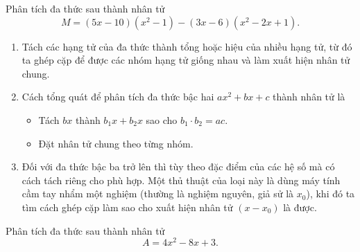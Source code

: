 \begin{vd}
Phân tích đa thức sau thành nhân tử
\[M=(5x-10)\left( x^2-1\right) - (3x-6) \left( x^2-2x+1\right) .\]
\end{vd}

\begin{dang}
\begin{enumerate}[\tickEX]
\item Tách các hạng tử của đa thức thành tổng hoặc hiệu của nhiều hạng tử, từ đó ta ghép cặp để được các nhóm hạng tử giống nhau và làm xuất hiện nhân tử chung.
\item Cách tổng quát để phân tích đa thức bậc hai $ax^2+bx+c$ thành nhân tử là 
\begin{itemize}
\item Tách $bx$ thành $b_1x+b_2x$ sao cho $b_1\cdot b_2=ac$.
\item Đặt nhân tử chung theo từng nhóm.
\end{itemize}
\item Đối với đa thức bậc ba trở lên thì tùy theo đặc điểm của các hệ số mà có cách tách riêng cho phù hợp. Một thủ thuật của loại này là dùng máy tính cầm tay nhẩm một nghiệm (thường là nghiệm nguyên, giả sử là $x_0$), khi đó ta tìm cách ghép cặp làm sao cho xuất hiện nhân tử $(x-x_0)$ là được.
\end{enumerate}
\end{dang}

\begin{vd}
Phân tích đa thức sau thành nhân tử
\[A=4x^2-8x+3.\]
\end{vd}


